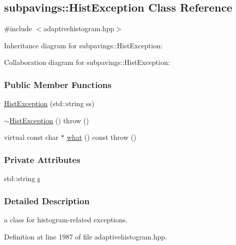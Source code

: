 \hypertarget{classsubpavings_1_1HistException}{\subsection{subpavings\-:\-:\-Hist\-Exception \-Class \-Reference}
\label{classsubpavings_1_1HistException}
}


{\ttfamily \#include $<$adaptivehistogram.\-hpp$>$}



\-Inheritance diagram for subpavings\-:\-:\-Hist\-Exception\-:


\-Collaboration diagram for subpavings\-:\-:\-Hist\-Exception\-:
\subsubsection*{\-Public \-Member \-Functions}
\begin{DoxyCompactItemize}
\item 
\hyperlink{classsubpavings_1_1HistException_a30a3ad6d38a4913062edf162382fbe54}{\-Hist\-Exception} (std\-::string ss)
\item 
\hyperlink{classsubpavings_1_1HistException_acdc02a56739daf196a7d44e48951d83c}{$\sim$\-Hist\-Exception} ()  throw ()
\item 
virtual const char $\ast$ \hyperlink{classsubpavings_1_1HistException_a08b10aa1f131d863b2260fca714afdbe}{what} () const   throw ()
\end{DoxyCompactItemize}
\subsubsection*{\-Private \-Attributes}
\begin{DoxyCompactItemize}
\item 
std\-::string \hyperlink{classsubpavings_1_1HistException_a0fa63652ca7c257562f3c590805d5d06}{s}
\end{DoxyCompactItemize}


\subsubsection{\-Detailed \-Description}
a class for histogram-\/related exceptions. 

\-Definition at line 1987 of file adaptivehistogram.\-hpp.



